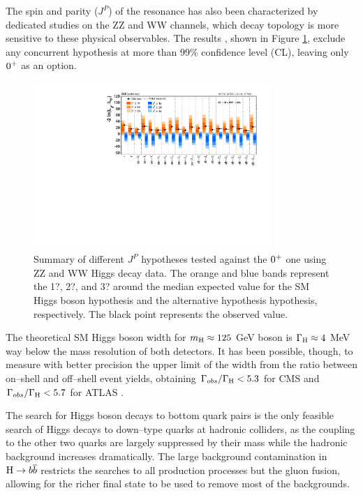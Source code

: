 The spin and parity ($J^P$) of the resonance has also been characterized by dedicated studies on the ZZ and WW channels, which decay topology is more sensitive to these physical observables. The results \cite{CMS:2014gga}, shown in Figure \ref{fig:hjp}, exclude any concurrent hypothesis at more than 99\% confidence level (CL), leaving only $0^{+}$ as an option.

\begin{figure}
        \centering
	\includegraphics[width=0.8\textwidth]{1_Introduction_Th_and_Exp/pics/hwwhzz_JP_SummaryPlot.pdf}
       \caption{Summary of different $J^P$ hypotheses tested against the $0^{+}$ one using ZZ and WW Higgs decay data. The orange and blue bands represent the 1?, 2?, and 3? around the median expected value for the SM Higgs boson hypothesis and the alternative hypothesis hypothesis, respectively. The black point represents the observed value. }
       \label{fig:hjp}
\end{figure}

The theoretical SM Higgs boson width for $m_{\mathrm{H}} \approx 125$ GeV boson is $\Gamma_{\mathrm{H}} \approx 4$ MeV way below the mass resolution of both detectors. It has been possible, though, to measure with better precision the upper limit of the width from the ratio between on--shell and off--shell event yields, obtaining $\Gamma_{obs} / \Gamma_{\mathrm{H}} < 5.3$ for CMS \cite{Khachatryan:2014iha} and $\Gamma_{obs} / \Gamma_{\mathrm{H}} < 5.7$ for ATLAS \cite{ATLASCONF:2014042}. 

The search for Higgs boson decays to bottom quark pairs is the only feasible search of Higgs decays to down--type quarks at hadronic colliders, as the coupling to the other two quarks are largely suppressed by their mass while the hadronic background increases dramatically. The large background contamination in $\mathrm{H}\rightarrow b\overline{b}$ restricts the searches to all production processes but the gluon fusion, allowing for the richer final state to be used to remove most of the backgrounds.

